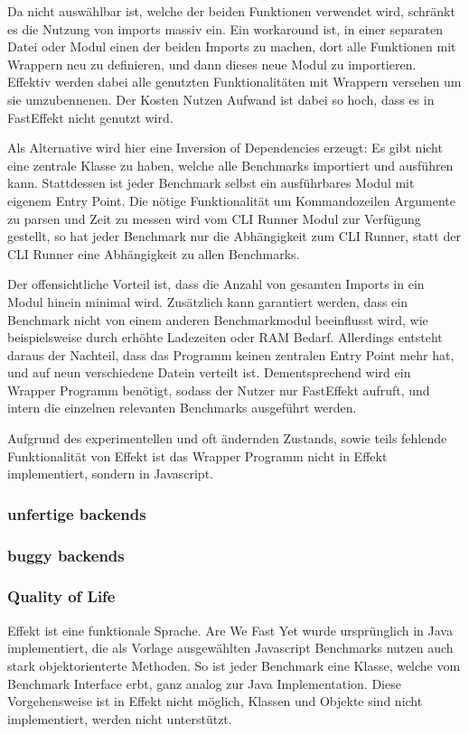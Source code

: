 Da nicht auswählbar ist, welche der beiden Funktionen verwendet wird, schränkt es die Nutzung von imports massiv ein. Ein workaround ist, in einer
separaten Datei oder Modul einen der beiden Imports zu machen, dort alle Funktionen mit Wrappern neu zu definieren, und dann dieses neue Modul zu importieren.
Effektiv werden dabei alle genutzten Funktionalitäten mit Wrappern versehen um sie umzubennenen. Der Kosten Nutzen Aufwand ist dabei so hoch, dass es in FastEffekt nicht genutzt wird.

Als Alternative wird hier eine Inversion of Dependencies erzeugt: Es gibt nicht eine zentrale Klasse zu haben, welche alle Benchmarks importiert und ausführen kann.
Stattdessen ist jeder Benchmark selbst ein ausführbares Modul mit eigenem Entry Point. Die nötige Funktionalität um Kommandozeilen Argumente zu parsen und Zeit zu messen wird vom
CLI Runner Modul zur Verfügung gestellt, so hat jeder Benchmark nur die Abhängigkeit zum CLI Runner, statt der CLI Runner eine Abhängigkeit zu allen Benchmarks.

Der offensichtliche Vorteil ist, dass die Anzahl von gesamten Imports in ein Modul hinein minimal wird. Zusätzlich kann garantiert werden, dass ein Benchmark nicht von einem anderen Benchmarkmodul beeinflusst wird, 
wie beispielsweise durch erhöhte Ladezeiten oder RAM Bedarf. 
Allerdings entsteht daraus der Nachteil, dass das Programm keinen zentralen Entry Point mehr hat, und auf neun verschiedene Datein verteilt ist. Dementsprechend wird ein 
Wrapper Programm benötigt, sodass der Nutzer nur FastEffekt aufruft, und intern die einzelnen relevanten Benchmarks ausgeführt werden.

Aufgrund des experimentellen und oft ändernden Zustands, sowie teils fehlende Funktionalität von Effekt ist das Wrapper Programm nicht in Effekt implementiert, sondern in Javascript.

\subsubsection{unfertige backends}

\subsubsection{buggy backends}



\subsubsection{ Quality of Life }
Effekt ist eine funktionale Sprache. Are We Fast Yet wurde ursprünglich in Java implementiert, die als Vorlage ausgewählten Javascript Benchmarks nutzen auch stark objektorienterte Methoden.
So ist jeder Benchmark eine Klasse, welche vom Benchmark Interface erbt, ganz analog zur Java Implementation.
Diese Vorgehensweise ist in Effekt nicht möglich, Klassen und Objekte sind nicht implementiert, werden nicht unterstützt.

